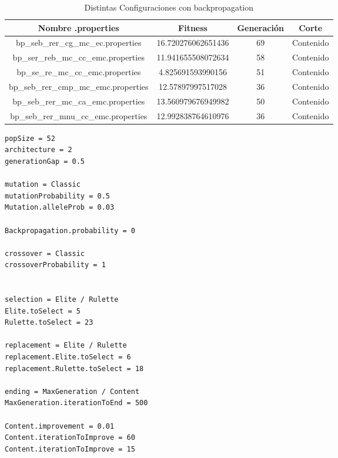 \documentclass{sig-alternate}
\begin{document}
\begin{table}[htp]
	\begin{center}
	\begin{tabular}{|c|c|c|c|}
		\hline
	     Nombre .properties & Fitness & Generación & Corte \\
		\hline
		bp\_seb\_rer\_cg\_mc\_ec.properties 		& 16.720276062651436 	& 69 & Contenido \\
		bp\_ser\_reb\_mc\_cc\_emc.properties 	& 11.941655508072634 	& 58 & Contenido \\
		bp\_se\_re\_mc\_cc\_emc.properties 		& 4.825691593990156 	& 51 & Contenido \\
		bp\_seb\_rer\_cmp\_mc\_emc.properties 	& 12.57897997517028 	& 36 & Contenido \\
		bp\_seb\_rer\_mc\_ca\_emc.properties 	& 13.560979676949982 	& 50 & Contenido \\
		bp\_seb\_rer\_mnu\_cc\_emc.properties 	& 12.992838764610976 	& 36 & Contenido \\
		\hline
	\end{tabular}
	\caption{Distintas Configuraciones con backpropagation}
	\label{table:backpropagation}
	\end{center}
\end{table}

\newpage
\begin{lstlisting}[caption={Archivo de configuración simple},label={code:simple}]
popSize = 52
architecture = 2
generationGap = 0.5

mutation = Classic
mutationProbability = 0.5
Mutation.alleleProb = 0.03

Backpropagation.probability = 0

crossover = Classic
crossoverProbability = 1


selection = Elite / Rulette
Elite.toSelect = 5
Rulette.toSelect = 23

replacement = Elite / Rulette
replacement.Elite.toSelect = 6
replacement.Rulette.toSelect = 18

ending = MaxGeneration / Content
MaxGeneration.iterationToEnd = 500

Content.improvement = 0.01
Content.iterationToImprove = 60
Content.iterationToImprove = 15

\end{lstlisting}
\end{document}
